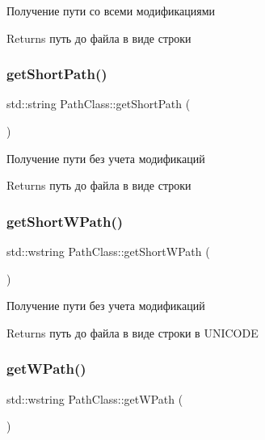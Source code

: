 Получение пути со всеми модификациями 

\begin{DoxyReturn}{Returns}
путь до файла в виде строки 
\end{DoxyReturn}
\mbox{\label{class_path_class_a152fffeff3269d3fbcec37be7fc8b9a7}} 
\subsubsection{\texorpdfstring{get\+Short\+Path()}{getShortPath()}}
{\footnotesize\ttfamily std\+::string Path\+Class\+::get\+Short\+Path (\begin{DoxyParamCaption}{ }\end{DoxyParamCaption})}



Получение пути без учета модификаций 

\begin{DoxyReturn}{Returns}
путь до файла в виде строки 
\end{DoxyReturn}
\mbox{\label{class_path_class_ae6687a83d981a24ff5f4f0e2cb3f1914}} 
\subsubsection{\texorpdfstring{get\+Short\+W\+Path()}{getShortWPath()}}
{\footnotesize\ttfamily std\+::wstring Path\+Class\+::get\+Short\+W\+Path (\begin{DoxyParamCaption}{ }\end{DoxyParamCaption})}



Получение пути без учета модификаций 

\begin{DoxyReturn}{Returns}
путь до файла в виде строки в U\+N\+I\+C\+O\+DE 
\end{DoxyReturn}
\mbox{\label{class_path_class_a1056eec1f69de932c586b01c100b4549}} 
\subsubsection{\texorpdfstring{get\+W\+Path()}{getWPath()}}
{\footnotesize\ttfamily std\+::wstring Path\+Class\+::get\+W\+Path (\begin{DoxyParamCaption}{ }\end{DoxyParamCaption})}



